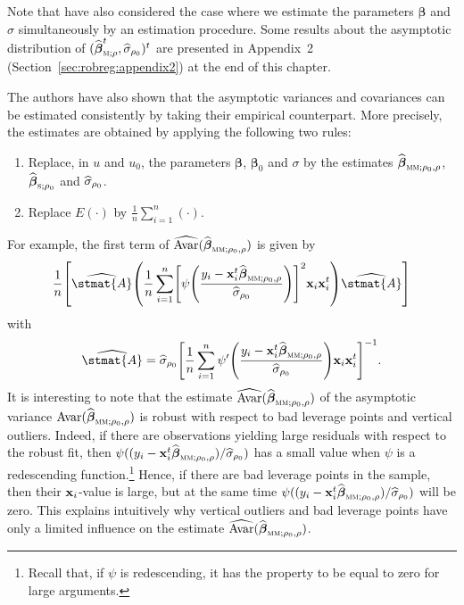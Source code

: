 \begin{stremark}
Note that \citet{Croux:2003} have also considered the case where we estimate
the parameters $\boldsymbol\beta$ and $\sigma$ simultaneously by an 
estimation procedure. Some results about the asymptotic distribution of
$(\sthat{\boldsymbol\beta}_{\stsc{M};\rho}^t, \sthat{\sigma}_{\rho_0})^t$ are
presented in Appendix~2 (Section~\ref{sec:robreg:appendix2}) at the end of this
chapter.
\end{stremark}

The authors have also shown that the asymptotic variances and covariances can
be estimated consistently by taking their empirical counterpart. More
precisely, the estimates are obtained by applying the following two rules:
\begin{enumerate}
    \item Replace, in $u$ and $u_0$, the parameters $\boldsymbol\beta$,
    $\boldsymbol\beta_0$ and $\sigma$ by the estimates
    $\widehat{\boldsymbol\beta}_{\stsc{MM};\rho_0,\rho}$,
    $\sthat{\boldsymbol\beta}_{\stsc{S};\rho_0}$ and $\widehat{\sigma}_{\rho_0}$.

    \item Replace $E(\cdot)$ by $\frac{1}{n}\sum_{i=1}^{n}(\cdot)$.
\end{enumerate}
For example, the first term of
$\sthat{\mathrm{Avar}}(\widehat{\boldsymbol\beta}_{\stsc{MM};\rho_0,\rho})$ is
given by
\[
    \frac{1}{n} \left[\sthat{\stmat{A}}\left(
    \frac{1}{n} \sum_{i=1}^{n} \left[\psi\left(
    \frac{y_i - \stvec{x}_i^t\widehat{\boldsymbol\beta}_{\stsc{MM};\rho_0,\rho}}
    {\sthat{\sigma}_{\rho_0}}\right)\right]^2 \stvec{x}_i\stvec{x}_i^t\right)
    \widehat{\stmat{A}}\right]
\]
with
\[
    \sthat{\stmat{A}} = \sthat{\sigma}_{\rho_0}
    \left[\frac{1}{n} \sum_{i=1}^{n} 
    \psi'\left(\frac{y_i-\stvec{x}_i^t\widehat{\boldsymbol\beta}_{\stsc{MM};\rho_0,\rho}}
    {\sthat{\sigma}_{\rho_0}}\right) \stvec{x}_i\stvec{x}_i^t\right]^{-1}.
\]
It is interesting to note that the estimate $\sthat{\mathrm{Avar}}
(\sthat{\boldsymbol\beta}_{\stsc{MM};\rho_0,\rho})$ of the asymptotic variance
$\mathrm{Avar}(\sthat{\boldsymbol\beta}_{\stsc{MM};\rho_0,\rho})$ is robust
with respect to bad leverage points and vertical outliers. Indeed, if there are
observations yielding large residuals with respect to the robust  fit,
then
$\psi((y_i-\stvec{x}_i^t\sthat{\boldsymbol\beta}_{\stsc{MM};\rho_0,\rho})/\sthat{\sigma}_{\rho_0})$
has a small value when $\psi$ is a redescending function.\footnote{Recall that,
if $\psi$ is redescending, it has the property to be equal to zero for large
arguments.} Hence, if there are bad leverage points in the sample, then their
$\mathbf x_i$-value is large, but at the same time
$\psi((y_i-\stvec{x}_i^t\sthat{\boldsymbol\beta}_{\stsc{MM};\rho_0,\rho})/\sthat{\sigma}_{\rho_0})$ 
will be zero. This explains intuitively why vertical outliers and bad leverage
points have only a limited influence on the estimate
$\sthat{\mathrm{Avar}}(\widehat{\boldsymbol\beta}_{\stsc{MM};\rho_0,\rho})$.

